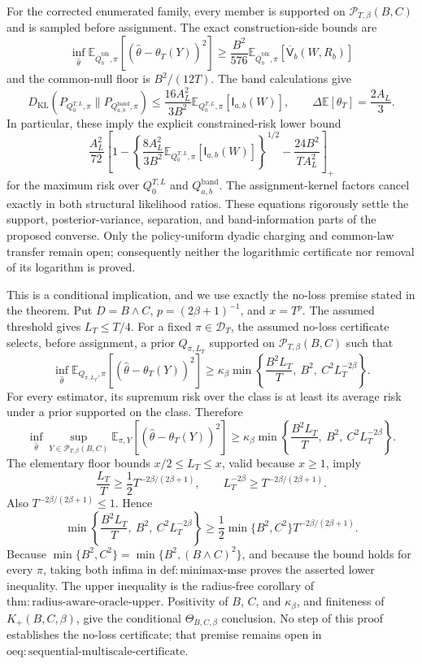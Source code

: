 For the corrected enumerated family, every member is supported on \(\mathcal P_{T,\beta}(B,C)\) and is sampled before assignment.  The exact construction-side bounds are
\[
 \inf_{\widehat\theta}
 \mathbb E_{\overline Q_b^{\mathrm{blk}},\pi}
 [ (\widehat\theta-\theta_T(Y))^2]
 \ge \frac{B^2}{576}
 \mathbb E_{\overline Q_b^{\mathrm{blk}},\pi}
 [\overline{\mathsf V}_b(W,R_b)]
\]
and the common-null floor is \(B^2/(12T)\).  The band calculations give
\[
D_{\mathrm{KL}}\!\left(
P_{Q_0^{T,L},\pi}\|P_{Q_{a,b}^{\mathrm{band}},\pi}
\right)
\le \frac{16A_L^2}{3B^2}
\mathbb E_{Q_0^{T,L},\pi}[\mathsf I_{a,b}(W)],
\qquad
\Delta\mathbb E[\theta_T]=\frac{2A_L}{3}.
\]
In particular, these imply the explicit constrained-risk lower bound
\[
 \frac{A_L^2}{72}
 \left[
 1-\left\{
 \frac{8A_L^2}{3B^2}
 \mathbb E_{Q_0^{T,L},\pi}[\mathsf I_{a,b}(W)]
 \right\}^{1/2}
 -\frac{24B^2}{TA_L^2}
 \right]_+
\]
for the maximum risk over \(Q_0^{T,L}\) and \(Q_{a,b}^{\mathrm{band}}\).
The assignment-kernel factors cancel exactly in both structural likelihood ratios.  These equations rigorously settle the support, posterior-variance, separation, and band-information parts of the proposed converse.  Only the policy-uniform dyadic charging and common-law transfer remain open; consequently neither the logarithmic certificate nor removal of its logarithm is proved.

This is a conditional implication, and we use exactly the no-loss premise stated in the theorem.  Put \(D=B\wedge C\), \(p=(2\beta+1)^{-1}\), and \(x=T^p\).  The assumed threshold gives \(L_T\le T/4\).  For a fixed \(\pi\in\mathcal D_T\), the assumed no-loss certificate selects, before assignment, a prior \(Q_{\pi,L_T}\) supported on \(\mathcal P_{T,\beta}(B,C)\) such that
\[
 \inf_{\widehat\theta}
 \mathbb E_{Q_{\pi,L_T},\pi}
 [ (\widehat\theta-\theta_T(Y))^2]
 \ge \kappa_\beta
 \min\left\{\frac{B^2L_T}{T},\ B^2,\ C^2L_T^{-2\beta}\right\}.
\]
For every estimator, its supremum risk over the class is at least its average risk under a prior supported on the class.  Therefore
\[
 \inf_{\widehat\theta}\sup_{Y\in\mathcal P_{T,\beta}(B,C)}
 \mathbb E_{\pi,Y}[(\widehat\theta-\theta_T(Y))^2]
 \ge \kappa_\beta
 \min\left\{\frac{B^2L_T}{T},\ B^2,\ C^2L_T^{-2\beta}\right\}.
\]
The elementary floor bounds \(x/2\le L_T\le x\), valid because \(x\ge1\), imply
\[
 \frac{L_T}{T}\ge\frac12T^{-2\beta/(2\beta+1)},
 \qquad
 L_T^{-2\beta}\ge T^{-2\beta/(2\beta+1)}.
\]
Also \(T^{-2\beta/(2\beta+1)}\le1\).  Hence
\[
 \min\left\{\frac{B^2L_T}{T},\ B^2,\ C^2L_T^{-2\beta}\right\}
 \ge \frac12\min\{B^2,C^2\}
 T^{-2\beta/(2\beta+1)}.
\]
Because \(\min\{B^2,C^2\}=\min\{B^2,(B\wedge C)^2\}\), and because the bound holds for every \(\pi\), taking both infima in \(\mathrm{def{:}minimax\mbox{-}mse}\) proves the asserted lower inequality.  The upper inequality is the radius-free corollary of \(\mathrm{thm{:}radius\mbox{-}aware\mbox{-}oracle\mbox{-}upper}\).  Positivity of \(B\), \(C\), and \(\kappa_\beta\), and finiteness of \(K_+(B,C,\beta)\), give the conditional \(\Theta_{B,C,\beta}\) conclusion.  No step of this proof establishes the no-loss certificate; that premise remains open in \(\mathrm{oeq{:}sequential\mbox{-}multiscale\mbox{-}certificate}\).

